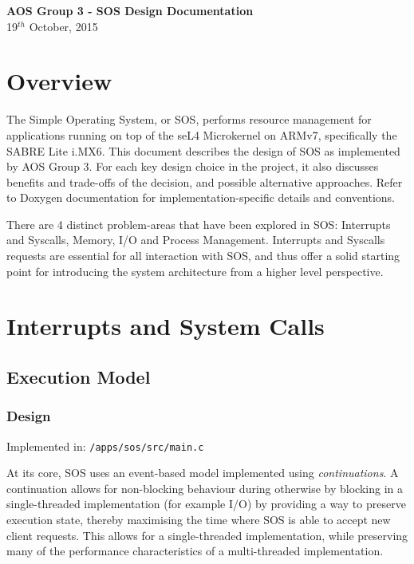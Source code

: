 \documentclass[a4paper,12pt]{article}
\begin{document}
\renewcommand{\headheight}{15pt}
\setlength{\parskip}{\baselineskip}%
\setlength{\parindent}{0pt}%
\begin{center}
  \vspace*{60mm}
  {\Large \bfseries{AOS Group 3 - SOS Design Documentation}}\\[8mm]
  19$^{th}$ October, 2015\\[20mm]
\end{center}
\newpage
\tableofcontents
\newpage
\section{Overview}
The Simple Operating System, or SOS, performs resource management for
applications running on top of the seL4 Microkernel on ARMv7, specifically the
SABRE Lite i.MX6.  This document describes the design of SOS as implemented by
AOS Group 3.  For each key design choice in the project, it also discusses
benefits and trade-offs of the decision, and possible alternative approaches.
Refer to Doxygen documentation for implementation-specific details and
conventions.

There are 4 distinct problem-areas that have been explored in SOS: Interrupts
and Syscalls, Memory, I/O and Process Management.  Interrupts and Syscalls
requests are essential for all interaction with SOS, and thus offer a solid
starting point for introducing the system architecture from a higher level
perspective.

\section{Interrupts and System Calls}
\subsection{Execution Model}
\subsubsection{Design}
Implemented in: \texttt{/apps/sos/src/main.c}

At its core, SOS uses an event-based model implemented using
\emph{continuations}.  A continuation allows for non-blocking behaviour during
otherwise by blocking in a single-threaded implementation (for example I/O) by
providing a way to preserve execution state, thereby maximising the time where
SOS is able to accept new client requests.  This allows for a single-threaded
implementation, while preserving many of the performance characteristics of a
multi-threaded implementation.
\end{document}
